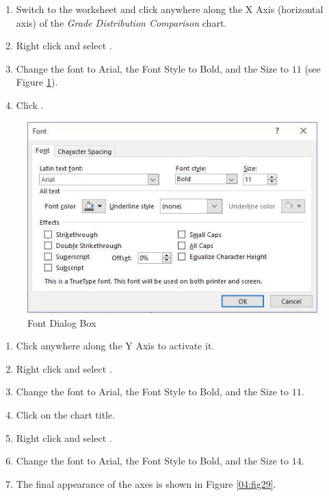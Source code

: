 \begin{enumerate}
	\item Switch to the  worksheet and click anywhere along the X Axis (horizontal axis) of the \textit{Grade Distribution Comparison} chart. 
	\item Right click and select .
	\item Change the font to Arial, the Font Style to Bold, and the Size to $ 11 $ (see Figure \ref{04:fig28}).
	\item Click .
\end{enumerate}

\begin{figure}[H]
	\centering
	\includegraphics[width=\maxwidth{.95\linewidth}]{gfx/ch04_fig28}
	\caption{Font Dialog Box}
	\label{04:fig28}
\end{figure}

\begin{enumerate}[resume]
	\item Click anywhere along the Y Axis to activate it.
	\item Right click and select .
	\item Change the font to Arial, the Font Style to Bold, and the Size to $ 11 $.
	\item Click on the chart title.
	\item Right click and select .
	\item Change the font to Arial, the Font Style to Bold, and the Size to $ 14 $.
	\item The final appearance of the axes is shown in Figure \ref{04:fig29}.
\end{enumerate}

